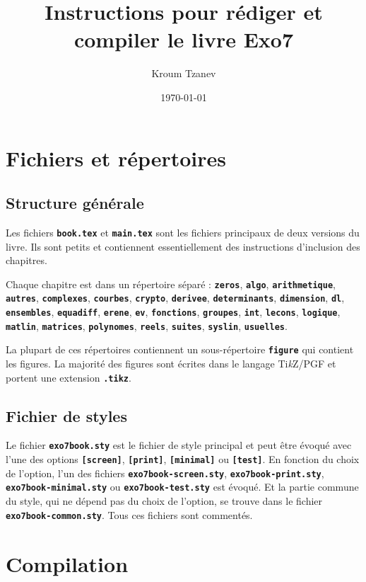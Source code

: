 \documentclass[11pt]{article} %
\title{Instructions pour rédiger et compiler le livre Exo7}
\author{Kroum Tzanev}
\date{\today}
\newcommand{\cmd}[1]{\textbf{\texttt{\color{red!70!black}#1}}}
\begin{document}
\maketitle

\section{Fichiers et répertoires}

\subsection{Structure générale}

Les fichiers \cmd{book.tex} et \cmd{main.tex} sont les fichiers principaux de deux versions du livre. Ils sont petits et contiennent essentiellement des instructions d'inclusion des chapitres.

Chaque chapitre est dans un répertoire séparé :
\cmd{zeros}, \cmd{algo}, \cmd{arithmetique}, \cmd{autres}, \cmd{complexes}, \cmd{courbes}, \cmd{crypto}, \cmd{derivee}, \cmd{determinants}, \cmd{dimension}, \cmd{dl}, \cmd{ensembles}, \cmd{equadiff}, \cmd{erene}, \cmd{ev}, \cmd{fonctions}, \cmd{groupes}, \cmd{int}, \cmd{lecons}, \cmd{logique}, \cmd{matlin}, \cmd{matrices}, \cmd{polynomes}, \cmd{reels}, \cmd{suites}, \cmd{syslin}, \cmd{usuelles}.

La plupart de ces répertoires contiennent un sous-répertoire \cmd{figure} qui contient les figures. La majorité des figures sont écrites dans le langage Ti\textit{k}Z/PGF et portent une extension \cmd{.tikz}.

\subsection{Fichier de styles}

Le fichier \cmd{exo7book.sty} est le fichier de style principal et peut être évoqué avec l'une des options \cmd{[screen]}, \cmd{[print]}, \cmd{[minimal]} ou \cmd{[test]}. En fonction du choix de l'option, l'un des fichiers \cmd{exo7book-screen.sty}, \cmd{exo7book-print.sty}, \cmd{exo7book-minimal.sty} ou \cmd{exo7book-test.sty} est évoqué. Et la partie commune du style, qui ne dépend pas du choix de l'option, se trouve dans le fichier \cmd{exo7book-common.sty}. Tous ces fichiers sont commentés.

\section{Compilation}
\end{document}
